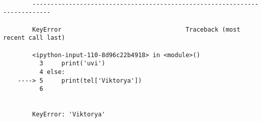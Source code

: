 \documentclass[11pt]{article}
\begin{document}
    \begin{Verbatim}[commandchars=\\\{\}]

        ---------------------------------------------------------------------------

        KeyError                                  Traceback (most recent call last)

        <ipython-input-110-8d96c22b4918> in <module>()
          3     print('uvi')
          4 else:
    ----> 5     print(tel['Viktorya'])
          6 


        KeyError: 'Viktorya'

    \end{Verbatim}


    
    
    
    
\end{document}
